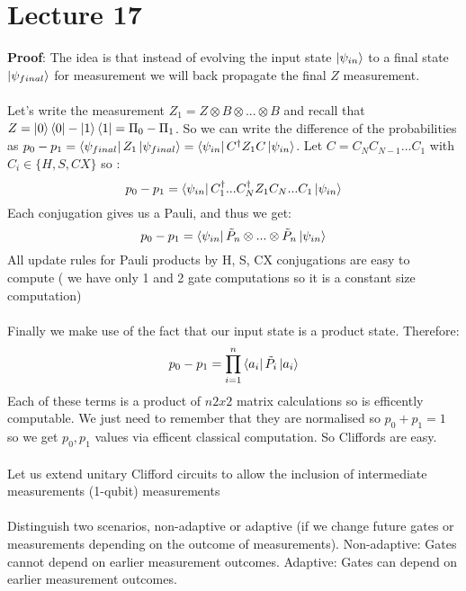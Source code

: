 \documentclass{article}
\begin{document}
               \section{Lecture 17}
               \textbf{Proof}: The idea is that instead of evolving the input state $\ket{\psi_{in}}$ to a final state $\ket{\psi_{final}}$ for measurement we will back propagate the final $Z$ measurement. \\\\
               Let's write the measurement $Z_1 = Z \otimes B \otimes ... \otimes B$ and recall that $Z = \ket{0} \bra{0} - \ket{1} \bra{1} = \Pi_0 - \Pi_1$. So we can write the difference of the probabilities as $p_0 - p_1 = \bra{\psi_{final}} Z_1 \ket{\psi_{final}} = \bra{\psi_{in}} C^{\dagger} Z_1 C \ket{\psi_{in}}$. Let $C = C_NC_{N-1} ... C_1$ with $C_i \in \{ H, S, CX\}$ so :
               $$
               p_0 - p_1 = \bra{\psi_{in}} C_1^{\dagger} ... C_{N}^{\dagger} Z_1 C_N ... C_1 \ket{\psi_{in}}
               $$
               Each conjugation gives us a Pauli, and thus we get:
               $$
               p_0 - p_1 = \bra{\psi_{in}} \tilde P_n \otimes ... \otimes \tilde P_n \ket{\psi_{in}}
               $$
               All update rules for Pauli products by H, S, CX conjugations are easy to compute ( we have only 1 and 2 gate computations so it is a constant size computation)\\\\
               Finally we make use of the fact that our input state is a product state. Therefore:
               $$
                p_0 - p_1 = \prod_{i=1}^n \bra{a_i} \tilde P_i \ket{a_i}
               $$
               Each of these terms is a product of $n 2x2$ matrix calculations so is efficently computable. We just need to remember that they are normalised so $p_0 + p_1 =1$ so we get $p_0, p_1$ values via efficent classical computation. So Cliffords are easy.\\\\
               Let us extend unitary Clifford circuits to allow the inclusion of intermediate measurements (1-qubit) measurements\\\\
               Distinguish two scenarios, non-adaptive or adaptive (if we change future gates or measurements depending on the outcome of measurements). Non-adaptive: Gates cannot depend on earlier measurement outcomes. Adaptive: Gates can depend on earlier measurement outcomes.\\\\
\end{document}
